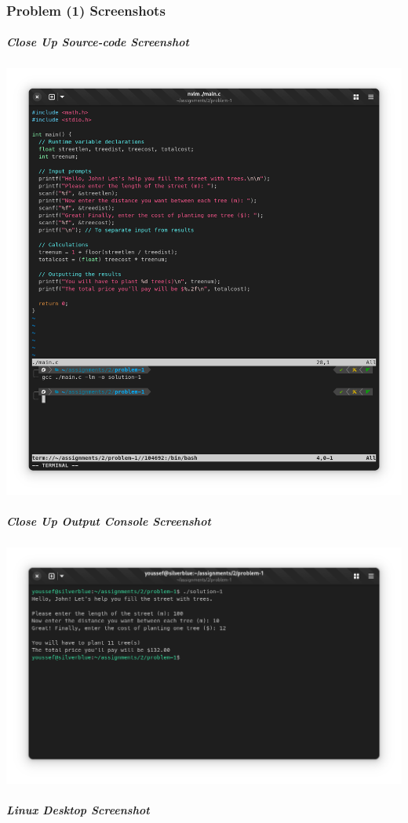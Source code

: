 \documentclass[a4paper,11pt]{article}
\theoremstyle{mytheor}
\theoremstyle{mytheor}
\begin{document}
\subsubsection{Problem (1) Screenshots}
\subparagraph{Close Up Source-code Screenshot\\}
\includegraphics[width=1\linewidth,center]{src-1.png}
\subparagraph{Close Up Output Console Screenshot\\}
\includegraphics[width=1\linewidth,center]{out-1.png}
\subparagraph{Linux Desktop Screenshot\\\\}
\end{document}
